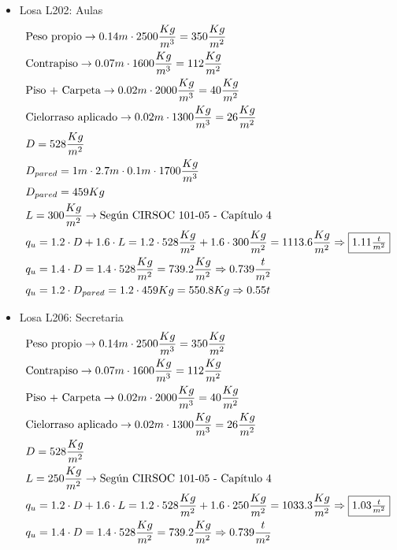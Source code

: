 \begin{enumerate}
\begin{itemize}
\item Losa L202: Aulas
\begin{align*}
& \text{Peso propio} \rightarrow 0.14m \cdot 2500 \frac{Kg}{m^3} = 350 \frac{Kg}{m^2}\\
& \text{Contrapiso} \rightarrow 0.07m \cdot 1600 \frac{Kg}{m^3} = 112 \frac{Kg}{m^2}\\
& \text{Piso + Carpeta} \rightarrow 0.02m \cdot 2000 \frac{Kg}{m^3} = 40 \frac{Kg}{m^2}\\
& \text{Cielorraso aplicado} \rightarrow  0.02m \cdot 1300 \frac{Kg}{m^3} = 26 \frac{Kg}{m^2}\\
& D = 528 \frac{Kg}{m^2}\\
& D_{pared} = 1m \cdot 2.7m \cdot 0.1m \cdot 1700\frac{Kg}{m^3} \\
& D_{pared} = 459 Kg \\
& L = 300 \frac{Kg}{m^2} \rightarrow \text{Según CIRSOC 101-05 - Capítulo 4}\\
& q_u = 1.2 \cdot D + 1.6 \cdot L = 1.2 \cdot 528 \frac{Kg}{m^2} + 1.6 \cdot 300 \frac{Kg}{m^2} = 1113.6 \frac{Kg}{m^2} \Rightarrow \framebox{$1.11 \frac{t}{m^2}$} \\
& q_u = 1.4 \cdot D = 1.4 \cdot 528 \frac{Kg}{m^2} = 739.2 \frac{Kg}{m^2} \Rightarrow 0.739 \frac{t}{m^2} \\
& q_u = 1.2 \cdot D_{pared} = 1.2 \cdot 459 Kg = 550.8 Kg \Rightarrow 0.55 t
\end{align*}

\item Losa L206: Secretaria
\begin{align*}
& \text{Peso propio} \rightarrow 0.14m \cdot 2500 \frac{Kg}{m^3} = 350 \frac{Kg}{m^2}\\
& \text{Contrapiso} \rightarrow 0.07m \cdot 1600 \frac{Kg}{m^3} = 112 \frac{Kg}{m^2}\\
& \text{Piso + Carpeta} \rightarrow 0.02m \cdot 2000 \frac{Kg}{m^3} = 40 \frac{Kg}{m^2}\\
& \text{Cielorraso aplicado} \rightarrow  0.02m \cdot 1300 \frac{Kg}{m^3} = 26 \frac{Kg}{m^2}\\
& D = 528 \frac{Kg}{m^2}\\
& L = 250 \frac{Kg}{m^2} \rightarrow \text{Según CIRSOC 101-05 - Capítulo 4}\\
& q_u = 1.2 \cdot D + 1.6 \cdot L = 1.2 \cdot 528 \frac{Kg}{m^2} + 1.6 \cdot 250 \frac{Kg}{m^2} = 1033.3 \frac{Kg}{m^2} \Rightarrow \framebox{$1.03 \frac{t}{m^2}$} \\
& q_u = 1.4 \cdot D = 1.4 \cdot 528 \frac{Kg}{m^2} = 739.2 \frac{Kg}{m^2} \Rightarrow 0.739 \frac{t}{m^2}
\end{align*}


\end{itemize}
\end{enumerate}
